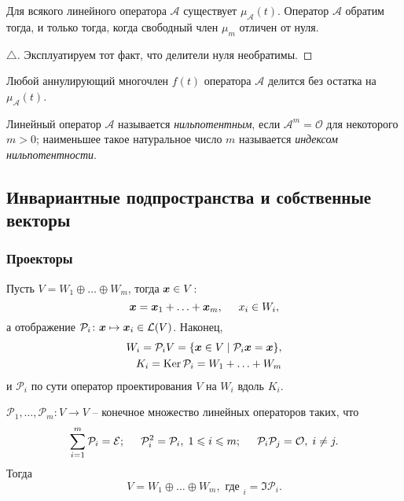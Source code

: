 \begin{to_thr} 
    Для всякого линейного оператора $\mathcal A $ существует $\mu_{\mathcal A} (t) $. Оператор $\mathcal A $ обратим тогда, и только тогда, когда свободный член $\mu_m $ отличен от нуля. 
\end{to_thr}

\begin{proof}[$\triangle$]
    Эксплуатируем тот факт, что делители нуля необратимы.
\end{proof}

\begin{to_thr} 
    Любой аннулирующий многочлен $f(t) $ оператора $\mathcal A $ делится без остатка на $\mu_{\mathcal A} (t) $. 
\end{to_thr}

\begin{to_def} 
    Линейный оператор $\mathcal A $ называется \textit{нильпотентным}, если $\mathcal A^m = \mathcal O $ для некоторого $m > 0 $; наименьшее такое натуральное число $m $ называется \textit{индексом нильпотентности}. 
\end{to_def}


\subsection{Инвариантные подпространства и собственные векторы}


\subsubsection{Проекторы}

Пусть $V = W_1 \oplus \ldots \oplus W_m $, тогда $\vc{x} \in V $:
$$
    \vc{x} = \vc{x}_1 + \ldots + \vc{x}_m, \hspace{0.5cm} x_i \in W_i,
$$
а отображение $\mathcal P_i \colon \vc{x} \mapsto \vc{x}_i \in \mathcal L (V)$. Наконец,
\begin{align*}
     W_i = \mathcal P_i V = \{\vc{x} \in V \mid \mathcal P_i \vc{x} = \vc{x}\}, \\
     K_i = \Ker \mathcal P_i = W_1 + \ldots + W_m
\end{align*} 
и $\mathcal P_i $ по сути оператор проектирования $V $ на $W_i $ вдоль $K_i $.

\begin{to_thr} 
    $\mathcal P_1, \ldots, \mathcal P_m \colon V \to V $ -- конечное множество линейных операторов таких, что 
$$
    \sum_{i=1}^m \mathcal P_i = \mathcal E; \hspace{0.5cm} \mathcal P_i^2 = \mathcal P_i, \; 1 \leq i \leq m; \hspace{0.5cm} \mathcal P_i \mathcal P_j = \mathcal O, \; i \neq j.
$$
Тогда 
$$
    V = W_1 \oplus \ldots \oplus W_m, \text{ где } _i = \Im \mathcal P_i.
$$
\end{to_thr}

